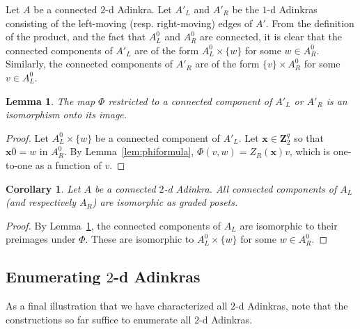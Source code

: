 \documentclass[12pt,twoside,singlespace]{article}
\numberwithin{equation}{section}
\newtheorem{lem}[equation]{Lemma}
\newtheorem{cor}[equation]{Corollary}
\theoremstyle{definition}
\newcommand{\ZZ}{\mathbf{Z}}
\renewcommand{\vec}[1]{\mathbf{#1}}
\begin{document}
Let $A$ be a connected $2$-d Adinkra.  Let $A'_L$ and $A'_R$ be the $1$-d Adinkras consisting of the left-moving (resp. right-moving) edges of $A'$.  From the definition of the product, and the fact that $A_L^0$ and $A_R^0$ are connected, it is clear that the connected components of $A'_L$ are of the form $A_L^0\times\{w\}$ for some $w\in A_R^0$.  Similarly, the connected components of $A'_R$ are of the form $\{v\}\times A_R^0$ for some $v\in A_L^0$.  

\begin{lem}
\label{lem:componentiso}
The map $\Phi$ restricted to a connected component of $A'_L$ or $A'_R$ is an isomorphism onto its image.
\end{lem}
\begin{proof}
Let $A_L^0\times\{w\}$ be a connected component of $A'_L$.  Let $\vec{x}\in\ZZ_2^q$ so that $\vec{x}\overline{0}=w$ in $A_R^0$.  By Lemma~\ref{lem:phiformula}, $\Phi(v,w)=Z_R(\vec{x})v$, which is one-to-one as a function of $v$.
\end{proof}

\begin{cor}
\label{cor:componentsiso}
Let $A$ be a connected $2$-d Adinkra.  All connected components of $A_L$ (and respectively $A_R$) are isomorphic as graded posets.
\end{cor}
\begin{proof}
By Lemma~\ref{lem:componentiso}, the connected components of $A_L$ are isomorphic to their preimages under $\Phi$.  These are isomorphic to $A_L^0\times\{w\}$ for some $w\in A_R^0$.
\end{proof}


\subsection{Enumerating $2$-d Adinkras}
As a final illustration that we have characterized all $2$-d Adinkras, note that the constructions so far suffice to enumerate all $2$-d Adinkras.
\end{document}
